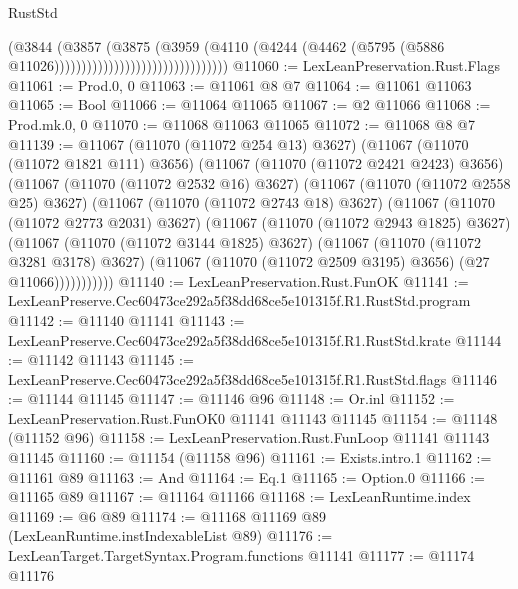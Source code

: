 \begin{lexlean}{RustStd}
\begin{coremodule}
                                                  (@3844
                                                    (@3857
                                                      (@3875
                                                        (@3959
                                                          (@4110
                                                            (@4244
                                                              (@4462
                                                                (@5795
                                                                  (@5886
                                                                    @11026))))))))))))))))))))))))))))))))
@11060 := LexLeanPreservation.Rust.Flags
@11061 := Prod.{0, 0}
@11063 := @11061 @8 @7
@11064 := @11061 @11063
@11065 := Bool
@11066 := @11064 @11065
@11067 := @2 @11066
@11068 := Prod.mk.{0, 0}
@11070 := @11068 @11063 @11065
@11072 := @11068 @8 @7
@11139 := @11067
    (@11070 (@11072 @254 @13) @3627)
    (@11067
      (@11070 (@11072 @1821 @111) @3656)
      (@11067
        (@11070 (@11072 @2421 @2423) @3656)
        (@11067
          (@11070 (@11072 @2532 @16) @3627)
          (@11067
            (@11070 (@11072 @2558 @25) @3627)
            (@11067
              (@11070 (@11072 @2743 @18) @3627)
              (@11067
                (@11070 (@11072 @2773 @2031) @3627)
                (@11067
                  (@11070 (@11072 @2943 @1825) @3627)
                  (@11067
                    (@11070 (@11072 @3144 @1825) @3627)
                    (@11067
                      (@11070 (@11072 @3281 @3178) @3627)
                      (@11067 (@11070 (@11072 @2509 @3195) @3656) (@27 @11066)))))))))))
@11140 := LexLeanPreservation.Rust.FunOK
@11141 := LexLeanPreserve.Cec60473ce292a5f38dd68ce5e101315f.R1.RustStd.program
@11142 := @11140 @11141
@11143 := LexLeanPreserve.Cec60473ce292a5f38dd68ce5e101315f.R1.RustStd.krate
@11144 := @11142 @11143
@11145 := LexLeanPreserve.Cec60473ce292a5f38dd68ce5e101315f.R1.RustStd.flags
@11146 := @11144 @11145
@11147 := @11146 @96
@11148 := Or.inl
@11152 := LexLeanPreservation.Rust.FunOK0 @11141 @11143 @11145
@11154 := @11148 (@11152 @96)
@11158 := LexLeanPreservation.Rust.FunLoop @11141 @11143 @11145
@11160 := @11154 (@11158 @96)
@11161 := Exists.intro.{1}
@11162 := @11161 @89
@11163 := And
@11164 := Eq.{1}
@11165 := Option.{0}
@11166 := @11165 @89
@11167 := @11164 @11166
@11168 := LexLeanRuntime.index
@11169 := @6 @89
@11174 := @11168 @11169 @89 (LexLeanRuntime.instIndexableList @89)
@11176 := LexLeanTarget.TargetSyntax.Program.functions @11141
@11177 := @11174 @11176

\end{coremodule}
\end{lexlean}
